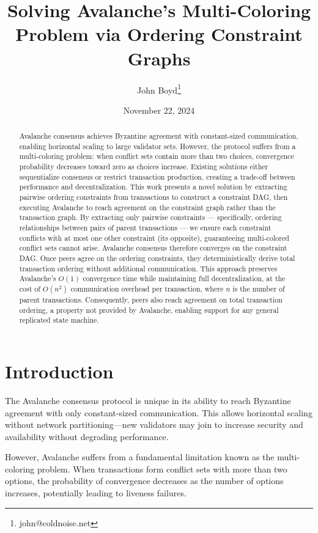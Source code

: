 \documentclass[12pt]{article}
\begin{document}
\title{Solving Avalanche's Multi-Coloring Problem via Ordering Constraint Graphs}
\author{John Boyd\thanks{john@coldnoise.net}}
\date{November 22, 2024}
\maketitle

\begin{abstract}
Avalanche consensus achieves Byzantine agreement with constant-sized
communication, enabling horizontal scaling to large validator sets. However,
the protocol suffers from a multi-coloring problem: when conflict sets contain
more than two choices, convergence probability decreases toward zero as choices
increase. Existing solutions either sequentialize consensus or restrict
transaction production, creating a trade-off between performance and
decentralization. This work presents a novel solution by extracting pairwise
ordering constraints from transactions to construct a constraint DAG, then
executing Avalanche to reach agreement on the constraint graph rather than the
transaction graph. By extracting only pairwise constraints — specifically,
ordering relationships between pairs of parent transactions — we ensure each
constraint conflicts with at most one other constraint (its opposite),
guaranteeing multi-colored conflict sets cannot arise. Avalanche consensus
therefore converges on the constraint DAG. Once peers agree on the ordering
constraints, they deterministically derive total transaction ordering without
additional communication. This approach preserves Avalanche's $O(1)$
convergence time while maintaining full decentralization, at the cost of
$O(n^2)$ communication overhead per transaction, where $n$ is the number of
parent transactions. Consequently, peers also reach agreement on total
transaction ordering, a property not provided by Avalanche, enabling support
for any general replicated state machine.
\end{abstract}

\section{Introduction}
The Avalanche consensus protocol \cite{rocket} is unique in its ability to
reach Byzantine agreement with only constant-sized communication. This allows
horizontal scaling without network partitioning—new validators may join to
increase security and availability without degrading performance.

However, Avalanche suffers from a fundamental limitation known as the
multi-coloring problem. When transactions form conflict sets with more than two
options, the probability of convergence decreases as the number of
options increases, potentially leading to liveness failures.
\end{document}
